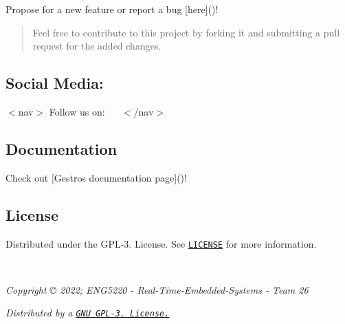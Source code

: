 Propose for a new feature or report a bug \mbox{[}here\mbox{]}()!

\begin{quote}
Feel free to contribute to this project by forking it and submitting a pull request for the added changes. \end{quote}


\subsection*{Social Media\+:}

$<$nav$>$ Follow us on\+:~\newline
~\newline
  \href{https://www.facebook.com/GestroProject}{\tt } \href{https://twitter.com/GestroProject}{\tt } \href{https://www.instagram.com/gestroproject/}{\tt } \href{https://hackaday.io/project/184728-gestro}{\tt }  $<$/nav$>$

\subsection*{Documentation}

Check out \mbox{[}Gestro\textquotesingle{}s documentation page\mbox{]}()!

\subsection*{License}

Distributed under the G\+P\+L-\/3. License. See \href{https://github.com/RandomGuy-coder/Gestro/blob/main/LICENSE}{\tt {\ttfamily L\+I\+C\+E\+N\+SE}} for more information.

~\newline
 
\footnotesize {\itshape Copyright \copyright{} 2022; E\+N\+G5220 -\/ Real-\/\+Time-\/\+Embedded-\/\+Systems -\/ Team 26}
\normalsize ~\newline
 
\footnotesize {\itshape Distributed by a \href{https://github.com/RandomGuy-coder/Gestro/blob/main/LICENSE}{\tt G\+NU G\+P\+L-\/3. License.} }
\normalsize 